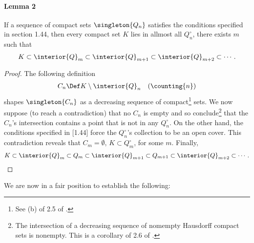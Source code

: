 \paragraph{Lemma 2} \label{1.16 Lemma 2}
If a sequence of compact sets $\singleton{Q_n}$ satisfies the conditions 
specified in section 1.44, then every compact set $K$ lies in allmost all 
%
  $Q^\circ_n$, \ie
%
there exists $m$ such that 
%
  \begin{align}
    K \subset 
    \interior{Q}_m 
      \subset 
    \interior{Q}_{m+1}
      \subset
    \interior{Q}_{m+2}
      \subset
    \cdots.
  \end{align}
%
\begin{proof}
The following definition
%
  \begin{align}
    C_n \Def K \setminus \interior{Q}_n \quad (\counting{n})
  \end{align}
%
shapes $\singleton{C_n}$ as a decreasing sequence of compact\footnote{
  See (b) of 2.5 of \cite{BigRudin}.
} 
sets. We now suppose (to reach a contradiction) that 
% 
  no $C_n$ is empty 
% 
and so conclude\footnote{
  The intersection of a decreasing sequence of nomempty Hausdorff compact sets 
  is nonempty. This is a corollary of 2.6 of \cite{BigRudin}.
} 
that the $C_n$'s intersection contains a point that is not in any $Q^\circ_n$. 
On the other hand, the conditions specified in [1.44] force the 
% 
  $Q^\circ_n$'s collection  
%
to be an open cover.
% 
This contradiction reveals that 
%
  $C_m = \emptyset$, 
    \ie 
  $K \subset Q^\circ_m$, 
%  
for some $m$.
%
Finally,  
%
  \begin{align}
    K\subset 
    \interior{Q}_m
      \subset
    Q_m
      \subset
    \interior{Q}_{m+1}
      \subset
    Q_{m +1}
      \subset
    \interior{Q}_{m+2}
      \subset
    \cdots.
  \end{align}  
%
\end{proof}
\noindent We are now in a fair position to establish the following:
